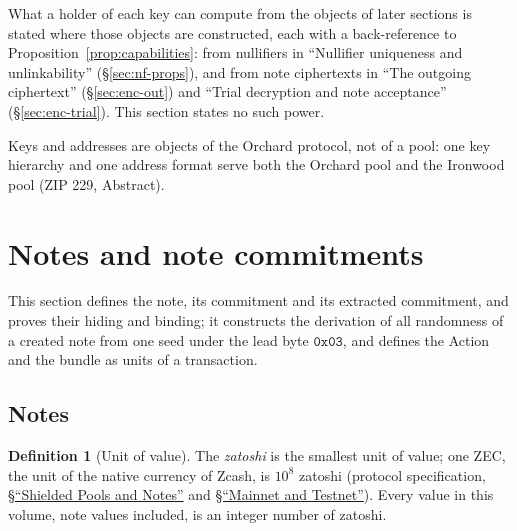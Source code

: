 \documentclass[11pt,a4paper]{article}
\theoremstyle{definition}
\newtheorem{definition}[theorem]{Definition}
\begin{document}
What a holder of each key can compute from the objects of later sections is
stated where those objects are constructed, each with a back-reference to
Proposition~\ref{prop:capabilities}: from nullifiers in ``Nullifier
uniqueness and unlinkability'' (\S\ref{sec:nf-props}), and from note
ciphertexts in ``The outgoing ciphertext'' (\S\ref{sec:enc-out}) and ``Trial
decryption and note acceptance'' (\S\ref{sec:enc-trial}). This section states
no such power.

Keys and addresses are objects of the Orchard protocol, not of a pool: one
key hierarchy and one address format serve both the Orchard pool and the
Ironwood pool (ZIP 229, Abstract).

\section{Notes and note commitments}\label{sec:notes}

This section defines the note, its commitment and its extracted commitment,
and proves their hiding and binding; it constructs the derivation of all
randomness of a created note from one seed under the lead byte
$\mathtt{0x03}$, and defines the Action and the bundle as units of a
transaction.

\subsection{Notes}\label{sec:notes-note}

\begin{definition}[Unit of value]
The \emph{zatoshi} is the smallest unit of value; one ZEC, the unit of the
native currency of Zcash, is $10^8$ zatoshi (protocol specification,
\href{https://zips.z.cash/protocol/protocol.pdf#notes}%
{\S``Shielded Pools and Notes''} and
\href{https://zips.z.cash/protocol/protocol.pdf#networks}%
{\S``Mainnet and Testnet''}). Every value in this volume, note values
included, is an integer number of zatoshi.
\end{definition}
\end{document}
